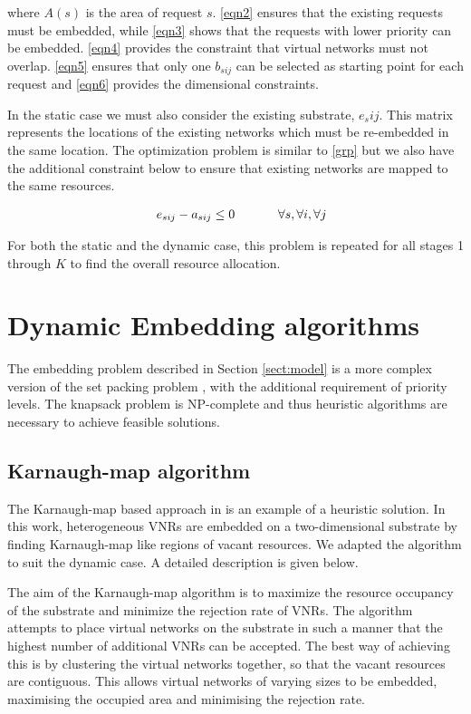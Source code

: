 \documentclass[conference]{IEEEtran}
\begin{document}
\noindent where $A(s)$ is the area of request $s$. \eqref{eqn2} ensures that the existing requests must be embedded, while \eqref{eqn3} shows that the requests with lower priority can be embedded. \eqref{eqn4} provides the constraint that virtual networks must not overlap. \eqref{eqn5} ensures that only one $b_{sij}$ can be selected as starting point for each request and \eqref{eqn6} provides the dimensional constraints.

In the static case we must also consider the existing substrate, $e_sij$. This matrix represents the locations of the existing networks which must be re-embedded in the same location. The optimization problem is similar to \eqref{grp} but we also have the additional constraint below to ensure that existing networks are mapped to the same resources.

\begin{align}
\label{eqn9}
& & e_{sij} - a_{sij} \leq 0 \hspace{12mm} \forall s, \forall i, \forall j
\end{align}

For both the static and the dynamic case, this problem is repeated for all stages 1 through $K$ to find the overall resource allocation.


\section{Dynamic Embedding algorithms}
\label{sect:implementation}

The embedding problem described in Section \ref{sect:model} is a more complex version of the set packing problem \cite{Crescenzi1998}, with the additional requirement of priority levels. The knapsack problem is NP-complete and thus heuristic algorithms are necessary to achieve feasible solutions.

\subsection{Karnaugh-map algorithm}
The Karnaugh-map based approach in \cite{Yang2012} is an example of a heuristic solution. In this work, heterogeneous VNRs are embedded on a two-dimensional substrate by finding Karnaugh-map like regions of vacant resources. We adapted the algorithm to suit the dynamic case. A detailed description is given below.

The aim of the Karnaugh-map algorithm is to maximize the resource occupancy of the substrate and minimize the rejection rate of VNRs. The algorithm attempts to place virtual networks on the substrate in such a manner that the highest number of additional VNRs can be accepted. The best way of achieving this is by clustering the virtual networks together, so that the vacant resources are contiguous. This allows virtual networks of varying sizes to be embedded, maximising the occupied area and minimising the rejection rate.
\end{document}

